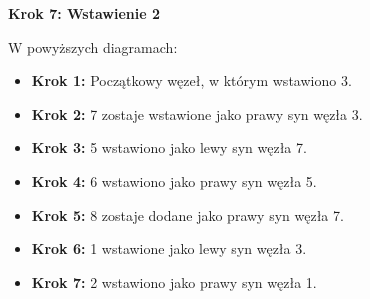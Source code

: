 \documentclass[11pt,a4paper]{article}
\begin{document}
\begin{itemize}
\begin{center}
            \textbf{Krok 7: Wstawienie 2}\\[0.5ex]
        \end{center}

        W powyższych diagramach:
        \begin{itemize}
            \item \textbf{Krok 1:} Początkowy węzeł, w którym wstawiono 3.
            \item \textbf{Krok 2:} 7 zostaje wstawione jako prawy syn węzła 3.
            \item \textbf{Krok 3:} 5 wstawiono jako lewy syn węzła 7.
            \item \textbf{Krok 4:} 6 wstawiono jako prawy syn węzła 5.
            \item \textbf{Krok 5:} 8 zostaje dodane jako prawy syn węzła 7.
            \item \textbf{Krok 6:} 1 wstawione jako lewy syn węzła 3.
            \item \textbf{Krok 7:} 2 wstawiono jako prawy syn węzła 1.
        \end{itemize}


\end{itemize}
\end{document}
